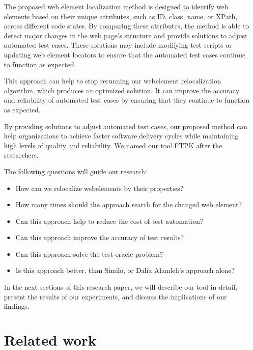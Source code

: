 \documentclass{article}
\begin{document}
The proposed web element localization method is designed to identify web elements based on their unique attributes, such as ID, class, name, or XPath, across different code states. By comparing these attributes, the method is able to detect major changes in the web page's structure and provide solutions to adjust automated test cases. These solutions may include modifying test scripts or updating web element locators to ensure that the automated test cases continue to function as expected.

This approach can help to stop rerunning our webelement relocalization algorithm, which produces an optimized solution. It can improve the accuracy and reliability of automated test cases by ensuring that they continue to function as expected.

By providing solutions to adjust automated test cases, our proposed method can help organizations to achieve faster software delivery cycles while maintaining high levels of quality and reliability. We named our tool FTPK after the researchers.

The following questions will guide our research:

\begin{itemize}
\item How can we relocalize webelements by their properties?
\item How many times should the approach search for the changed web element?
\item Can this approach help to reduce the cost of test automation?
\item Can this approach improve the accuracy of test results?
\item Can this approach solve the test oracle problem?
\item Is this approach better, than Similo, or Dalia Alamleh's approach alone?
\end{itemize}

In the next sections of this research paper, we will describe our tool in detail, present the results of our experiments, and discuss the implications of our findings.

\maketitle

\section{Related work}
\end{document}

